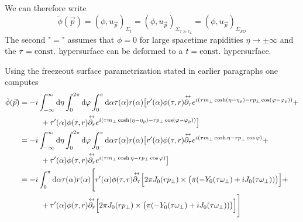 We can therefore write
\begin{equation}
    \tilde{\phi}(\vec{p})=(\phi,u_{\vec{p}})_{\Sigma_t}=(\phi,u_{\vec{p}})_{\Sigma_{\tau\gg\tau_L}}=(\phi,u_{\vec{p}})_{\Sigma_{FO}}
\end{equation}
The second "$=$" assumes that $\phi=0$ for large spacetime rapidities $\eta\to\pm\infty$ and the $\tau={\text{const.}}$ hypersurface can be deformed to a $t={\text{const.}}$ hypersurface.

Using the freezeout surface parametrization stated in earlier paragraphs one computes
\begin{subequations}
    \begin{align}
        \tilde{\phi}(\vec{p}) & =-\imagu\int_{-\infty}^\infty\dt\eta\int_0^{2\pi}\dt\varphi\int_0^\pi\dt\alpha\tau(\alpha) r(\alpha)\big[r^\prime(\alpha)\phi(\tau,r)\overset{\leftrightarrow}{\partial_\tau}e^{\imagu(\tau m_\perp\cosh(\eta-\eta_p)-r p_\perp\cos(\varphi-\varphi_p))}+\nonumber \\
                              & \phantom{=}\qquad + \tau^\prime(\alpha)\phi(\tau,r)\overset{\leftrightarrow}{\partial_r}e^{\imagu(\tau m_\perp\cosh(\eta-\eta_p)-r p_\perp\cos(\varphi-\varphi_p))}\big]                                                                                           \\
                              & =-\imagu\int_{-\infty}^\infty\dt\eta\int_0^{2\pi}\dt\varphi\int_0^\pi\dt\alpha\tau(\alpha) r(\alpha)\big[r^\prime(\alpha)\phi(\tau,r)\overset{\leftrightarrow}{\partial_\tau}e^{\imagu(\tau m_\perp\cosh\eta-r p_\perp\cos\varphi)}+\nonumber                      \\
                              & \phantom{=}\qquad + \tau^\prime(\alpha)\phi(\tau,r)\overset{\leftrightarrow}{\partial_r}e^{\imagu(\tau m_\perp\cosh\eta-r p_\perp\cos\varphi)}\big]                                                                                                                \\
                              & =-\imagu\int_0^\pi\dt\alpha\tau(\alpha) r(\alpha)\Bigg[r^\prime(\alpha)\phi(\tau,r)\overset{\leftrightarrow}{\partial_\tau}\Big[2\pi J_0(r p_\perp)\times\big(\pi(-Y_0(\tau\omega_\perp)+\imagu J_0(\tau\omega_\perp))\big)\Big]+\nonumber                         \\
                              & \phantom{=}\qquad + \tau^\prime(\alpha)\phi(\tau,r)\overset{\leftrightarrow}{\partial_r}\Big[2\pi J_0(r p_\perp)\times\big(\pi(-Y_0(\tau\omega_\perp)+\imagu J_0(\tau\omega_\perp))\big)\Big]\Bigg]                                                                \\

\end{align}
\end{subequations}
